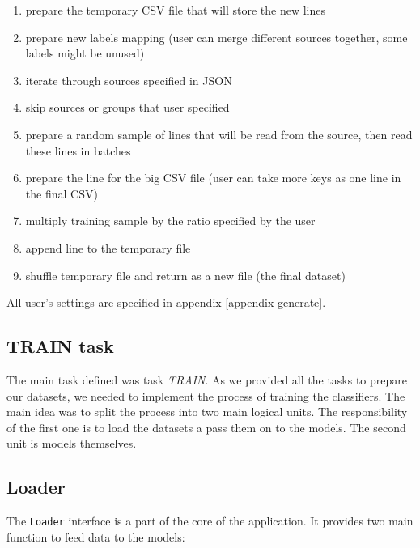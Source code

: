 \begin{enumerate}

\item prepare the temporary CSV file that will store the new lines

\item prepare new labels mapping (user can merge different sources together, some labels might be unused)

\item iterate through sources specified in JSON

\item skip sources or groups that user specified

\item prepare a random sample of lines that will be read from the source, then read these lines in batches

\item prepare the line for the big CSV file (user can take more keys as one line in the final CSV)

\item multiply training sample by the ratio specified by the user

\item append line to the temporary file

\item shuffle temporary file and return as a new file (the final dataset)

\end{enumerate}

\noindent
All user's settings are specified in appendix \ref{appendix-generate}.

\subsection{TRAIN task}

The main task defined was task \textit{TRAIN}. As we provided all the tasks to prepare our datasets, we needed to implement the process of training the classifiers. The main idea was to split the process into two main logical units. The responsibility of the first one is to load the datasets a pass them on to the models. The second unit is models themselves.

\subsection*{Loader}

The \texttt{Loader} interface is a part of the core of the application. It provides two main function to feed data to the models:


